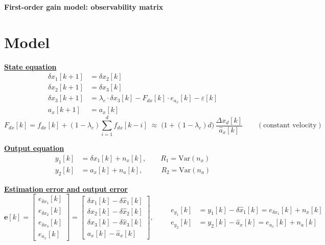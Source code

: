 \documentclass[11pt,a4paper]{ctexart}
\newcommand{\lc}{\lambda_c}
\newcommand{\hd}[1]{\par\bigskip\noindent\underline{\textbf{#1}}}
\begin{document}
\begin{center}\textbf{\large First-order gain model: observability matrix}\end{center}

\section{Model}

\hd{State equation}
\[
\begin{aligned}
\delta x_1[k+1] &= \delta x_2[k] \\
\delta x_2[k+1] &= \delta x_3[k] \\
\delta x_3[k+1] &= \lc \cdot \delta x_3[k] - F_{dx}[k]\cdot e_{a_x}[k] - \varepsilon[k] \\
a_x[k+1] &= a_x[k]
\end{aligned}
\]
\[
F_{dx}[k] = f_{dx}[k] + (1-\lc)\textstyle\sum_{i=1}^{d} f_{dx}[k-i] \;\approx\; \big(1 + (1-\lc)d\big)\,\dfrac{\Delta x_d[k]}{\hat a_x[k]} \qquad (\text{constant velocity})
\]

\hd{Output equation}
\[
\begin{aligned}
y_1[k] &= \delta x_1[k] + n_x[k], \qquad R_1 = \mathrm{Var}(n_x) \\
y_2[k] &= a_x[k] + n_a[k], \qquad\;\; R_2 = \mathrm{Var}(n_a)
\end{aligned}
\]

\hd{Estimation error and output error}
\[
\mathbf{e}[k] = \begin{bmatrix} e_{\delta x_1}[k] \\ e_{\delta x_2}[k] \\ e_{\delta x_3}[k] \\ e_{a_x}[k] \end{bmatrix}
= \begin{bmatrix} \delta x_1[k] - \delta\hat x_1[k] \\ \delta x_2[k] - \delta\hat x_2[k] \\ \delta x_3[k] - \delta\hat x_3[k] \\ a_x[k] - \hat a_x[k] \end{bmatrix},
\qquad
\begin{aligned}
e_{y_1}[k] &= y_1[k] - \delta\hat x_1[k] = e_{\delta x_1}[k] + n_x[k] \\
e_{y_2}[k] &= y_2[k] - \hat a_x[k] = e_{a_x}[k] + n_a[k]
\end{aligned}
\]
\end{document}
